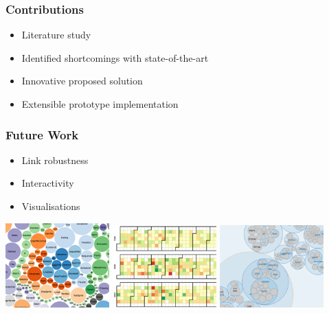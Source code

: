 \begin{frame}
	\frametitle{Contributions}
	\begin{block}{}
		\begin{itemize}
			\item Literature study
			\item Identified shortcomings with state-of-the-art
			\item Innovative proposed solution
			\item Extensible prototype implementation
		\end{itemize}
	\end{block}
\end{frame}
\begin{frame}
	\frametitle{Future Work}
	\begin{block}{}
		\begin{itemize}
			\item Link robustness
			\item Interactivity
			\item Visualisations
		\end{itemize}
	\end{block}
	\begin{center}
		\includegraphics[width=0.3\textwidth]{./images/futureWork1.png}\hspace{0.1cm}
		\includegraphics[width=0.3\textwidth]{./images/futureWork2.png}\hspace{0.1cm}
		\includegraphics[width=0.3\textwidth]{./images/futureWork3.png}\vspace{0.1cm}

\end{center}
\end{frame}
